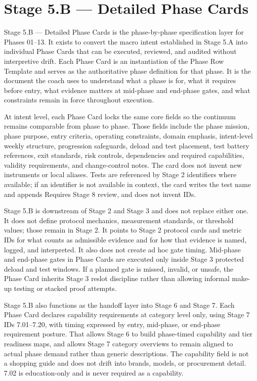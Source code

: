 \documentclass[10pt]{article}
\begin{document}
\section*{Stage 5.B — Detailed Phase Cards}
{}

Stage 5.B — Detailed Phase Cards is the phase-by-phase specification layer for Phases 01–13. It exists to convert the macro intent established in Stage 5.A into individual Phase Cards that can be executed, reviewed, and audited without interpretive drift. Each Phase Card is an instantiation of the Phase Row Template and serves as the authoritative phase definition for that phase. It is the document the coach uses to understand what a phase is for, what it requires before entry, what evidence matters at mid-phase and end-phase gates, and what constraints remain in force throughout execution.

At intent level, each Phase Card locks the same core fields so the continuum remains comparable from phase to phase. Those fields include the phase mission, phase purpose, entry criteria, operating constraints, domain emphasis, intent-level weekly structure, progression safeguards, deload and test placement, test battery references, exit standards, risk controls, dependencies and required capabilities, validity requirements, and change-control notes. The card does not invent new instruments or local aliases. Tests are referenced by Stage 2 identifiers where available; if an identifier is not available in context, the card writes the test name and appends Requires Stage 8 review, and does not invent IDs.

Stage 5.B is downstream of Stage 2 and Stage 3 and does not replace either one. It does not define protocol mechanics, measurement standards, or threshold values; those remain in Stage 2. It points to Stage 2 protocol cards and metric IDs for what counts as admissible evidence and for how that evidence is named, logged, and interpreted. It also does not create ad hoc gate timing. Mid-phase and end-phase gates in Phase Cards are executed only inside Stage 3 protected deload and test windows. If a planned gate is missed, invalid, or unsafe, the Phase Card inherits Stage 3 reslot discipline rather than allowing informal make-up testing or stacked proof attempts.

Stage 5.B also functions as the handoff layer into Stage 6 and Stage 7. Each Phase Card declares capability requirements at category level only, using Stage 7 IDs 7.01–7.20, with timing expressed by entry, mid-phase, or end-phase requirement posture. That allows Stage 6 to build phase-timed capability and tier readiness maps, and allows Stage 7 category overviews to remain aligned to actual phase demand rather than generic descriptions. The capability field is not a shopping guide and does not drift into brands, models, or procurement detail. 7.02 is education-only and is never required as a capability.
\end{document}
